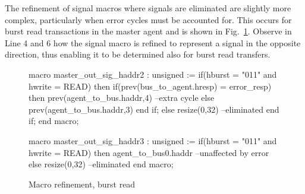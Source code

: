 The refinement of signal macros where signals are eliminated are slightly more complex, particularly when error cycles must be accounted for. This occurs for burst read transactions in the master agent and is shown in Fig.~\ref{fig:error-and-elimination}. Observe in Line 4 and 6 how the signal macro is refined to represent a signal in the opposite direction, thus enabling it to be determined also for burst read transfers. 

\begin{figure}[h!]
\begin{VHI}
macro master_out_sig_haddr2 : unsigned := 
if(hburst = "011" and hwrite = READ) then
if(prev(bus_to_agent.hresp) = error_resp) then
prev(agent_to_bus.haddr,4) --extra cycle
else
prev(agent_to_bus.haddr,3)
end if;
else
resize(0,32) --eliminated
end if;
end macro;

macro master_out_sig_haddr3 : unsigned :=
if(hburst = "011" and hwrite = READ) then
agent_to_bus0.haddr --unaffected by error
else
resize(0,32) --eliminated
end macro;
\end{VHI}
\caption{Macro refinement, burst read}
\label{fig:error-and-elimination}
\end{figure}

